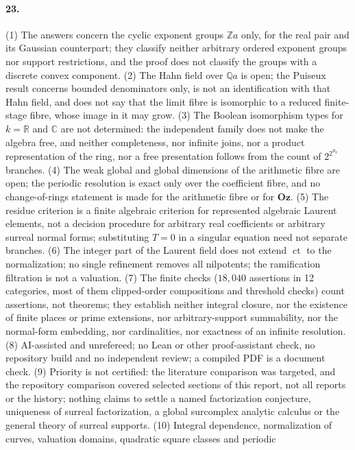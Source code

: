 \documentclass[11pt,letterpaper]{article}
\numberwithin{equation}{section}
\theoremstyle{definition}
\theoremstyle{remark}
\theoremstyle{plain}
\newcommand{\Oz}{\mathbf{Oz}}
\newcommand{\Z}{\mathbb Z}
\newcommand{\Q}{\mathbb Q}
\newcommand{\R}{\mathbb R}
\newcommand{\C}{\mathbb C}
\newcommand{\ct}{\operatorname{ct}}
\begin{document}
\paragraph{23.} (1) The answers concern the cyclic exponent groups $\Z a$ only, for the real pair and its Gaussian counterpart; they classify neither
arbitrary ordered exponent groups nor support restrictions, and the proof does not classify the groups with a discrete convex component. (2) The Hahn
field over $\Q a$ is open; the Puiseux result concerns bounded denominators only, is not an identification with that Hahn field, and does not say
that the limit fibre is isomorphic to a reduced finite-stage fibre, whose image in it may grow. (3) The Boolean isomorphism types for $k=\R$ and $\C$
are not determined: the independent family does not make the algebra free, and neither completeness, nor infinite joins, nor a product
representation of the ring, nor a free presentation follows from the count of $2^{2^{\aleph_0}}$ branches. (4) The weak global and global dimensions
of the arithmetic fibre are open; the periodic resolution is exact only over the coefficient fibre, and no change-of-rings statement is made for the
arithmetic fibre or for $\Oz$. (5) The residue criterion is a finite algebraic criterion for represented algebraic Laurent elements, not a decision
procedure for arbitrary real coefficients or arbitrary surreal normal forms; substituting $T=0$ in a singular equation need not separate branches.
(6) The integer part of the Laurent field does not extend $\ct$ to the normalization; no single refinement removes all nilpotents; the ramification
filtration is not a valuation. (7) The finite checks ($18{,}040$ assertions in 12 categories, most of them clipped-order compositions and threshold
checks) count assertions, not theorems; they establish neither integral closure, nor the existence of finite places or prime extensions, nor
arbitrary-support summability, nor the normal-form embedding, nor cardinalities, nor exactness of an infinite resolution. (8) AI-assisted and
unrefereed; no Lean or other proof-assistant check, no repository build and no independent review; a compiled PDF is a document check. (9) Priority is
not certified: the literature comparison was targeted, and the repository comparison covered selected sections of this report, not all reports or
the history; nothing claims to settle a named factorization conjecture, uniqueness of surreal factorization, a global surcomplex analytic calculus
or the general theory of surreal supports. (10) Integral dependence, normalization of curves, valuation domains, quadratic square classes and periodic
\end{document}
